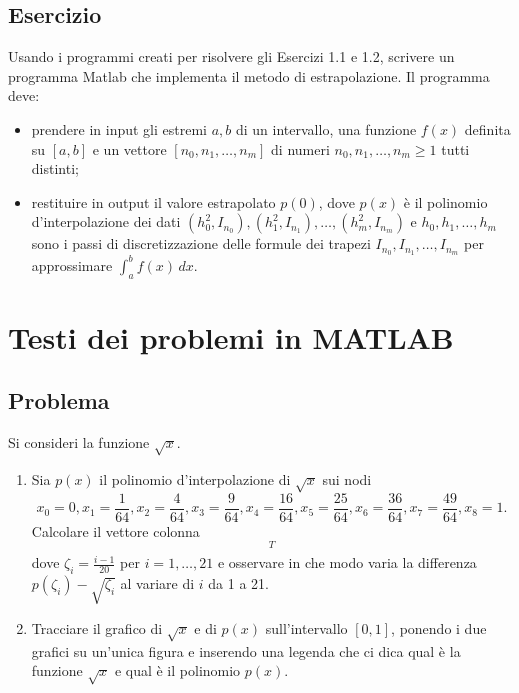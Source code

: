 \documentclass[a4paper,12pt]{article}
\begin{document}
\subsection{Esercizio}
Usando i programmi creati per risolvere gli Esercizi 1.1 e 1.2, scrivere un programma
Matlab che implementa il metodo di estrapolazione. Il programma deve:
\begin{itemize}
\item prendere in input gli estremi $a, b$ di un intervallo, una funzione $f(x)$ definita su $[a, b]$ e un vettore
$[n_0, n_1, \dots, n_m]$ di numeri $n_0, n_1, \dots, n_m\geq1$ tutti distinti;
\item restituire in output il valore estrapolato $p(0)$, dove $p(x)$ è il polinomio d’interpolazione dei dati $(h_0^2, I_{n_{0}}), (h_1^2, I_{n_{1}}), \dots, (h_m^2, I_{n_{m}}) $ e $h_0, h_1,\dots, h_m$ sono i passi di discretizzazione delle formule dei trapezi $ I_{n_{0}}, I_{n_{1}}, \dots, I_{n_{m}}$ per approssimare
$\int_{a}^{b} f(x) \,dx$.
\end{itemize}


\section{Testi dei problemi in MATLAB}
\subsection{Problema}
Si consideri la funzione $\sqrt{x}$.
\begin{enumerate}[label=(\alph*)]
\item Sia $p(x)$ il polinomio d’interpolazione di $\sqrt{x}$ sui nodi
\begin{equation*}
x_0=0,  x_1=\frac{1}{64}, x_2=\frac{4}{64}, x_3=\frac{9}{64}, x_4=\frac{16}{64}, x_5=\frac{25}{64}, x_6=\frac{36}{64}, x_7=\frac{49}{64}, x_8=1.
\end{equation*}
Calcolare il vettore colonna 
\begin{equation*}
[p(\zeta_1)-\sqrt{\zeta_1}, p(\zeta_2)-\sqrt{\zeta_2},\dots, p(\zeta_{21})-\sqrt{\zeta_{21}}]^T
\end{equation*}
dove $\zeta_i = \frac{i-1}{20}$ per $i=1,\dots,21$ e osservare in che modo varia la differenza $p(\zeta_i)-\sqrt{\zeta_i}$ al variare di $i$
da 1 a 21.
\item Tracciare il grafico di $\sqrt{x}$ e di $p(x)$ sull’intervallo $[0, 1]$, ponendo i due grafici su un’unica figura e inserendo una legenda che ci dica qual è la funzione $\sqrt{x}$ e qual è il polinomio $p(x)$.
\end{enumerate}
\end{document}
